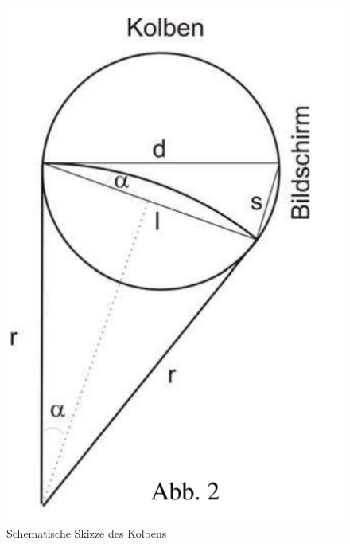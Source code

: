 \documentclass[ngerman]{scrartcl}
\begin{document}
\begin{minipage}[t]{0.35\linewidth}
    \begin{figure}[H]
        \centering
        \includegraphics[width=\linewidth]{fig/Kolben_skizze.png}
        \caption[Kolben Skizze]{Schematische Skizze des Kolbens}
        \label{fig:kolben_skizze}
    \end{figure}
\end{minipage}%
\hspace*{\fill}
\end{document}
